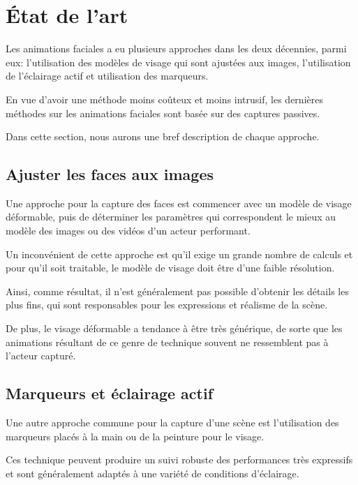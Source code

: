 \documentclass[a4paper,12pt]{article}
\begin{document}
\section{État de l'art}

Les animations faciales a eu plusieurs approches dans les deux décennies, 
parmi eux: l'utilisation des modèles de visage qui sont ajustées aux images, 
l'utilisation de l'éclairage actif et utilisation des marqueurs.

En vue d'avoir une méthode moins coûteux et moins intrusif, les dernières
méthodes sur les animations faciales sont basée sur des captures passives.


Dans cette section, nous aurons une bref description de chaque
approche.

\subsection*{Ajuster les faces aux images}
Une approche pour la capture des faces est commencer avec un modèle
de visage déformable, puis de déterminer les paramètres qui
correspondent le mieux au modèle des images ou des vidéos d'un acteur
performant. 

Un inconvénient de cette approche est qu'il exige un grande nombre de
calculs et pour qu'il soit traitable, le modèle de visage doit être
d'une faible résolution.

Ainsi, comme résultat, il n'est généralement pas possible d'obtenir les
détails les plus fins, qui sont responsables pour les expressions et
réalisme de la scène.

De plus, le visage déformable a tendance à être très générique, de
sorte que les animations résultant de ce genre de technique souvent ne
ressemblent pas à l'acteur capturé.

\subsection*{Marqueurs et éclairage actif}

Une autre approche commune pour la capture d'une scène est
l'utilisation des marqueurs placés à la main ou de la peinture pour le
visage.

Ces technique peuvent produire un suivi robuste des performances très
expressifs et sont généralement adaptés à une variété de conditions
d'éclairage.
\end{document}
